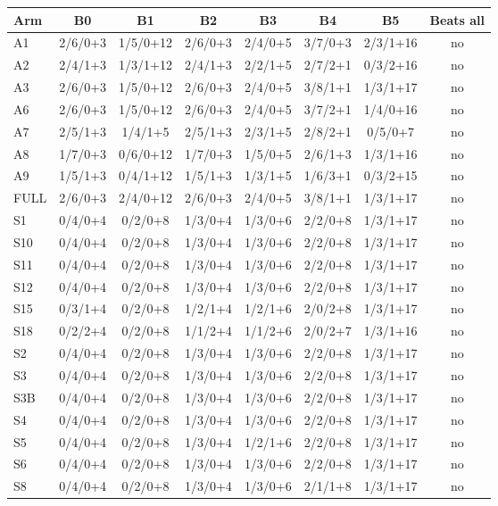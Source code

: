 \begin{table}[!t]
\centering\small
\begin{adjustbox}{max width=\textwidth}
\begin{tabular}{@{}lccccccc@{}}
\toprule
Arm & B0 & B1 & B2 & B3 & B4 & B5 & Beats all \\
\midrule
A1 & 2/6/0+3 & 1/5/0+12 & 2/6/0+3 & 2/4/0+5 & 3/7/0+3 & 2/3/1+16 & no \\
A2 & 2/4/1+3 & 1/3/1+12 & 2/4/1+3 & 2/2/1+5 & 2/7/2+1 & 0/3/2+16 & no \\
A3 & 2/6/0+3 & 1/5/0+12 & 2/6/0+3 & 2/4/0+5 & 3/8/1+1 & 1/3/1+17 & no \\
A6 & 2/6/0+3 & 1/5/0+12 & 2/6/0+3 & 2/4/0+5 & 3/7/2+1 & 1/4/0+16 & no \\
A7 & 2/5/1+3 & 1/4/1+5 & 2/5/1+3 & 2/3/1+5 & 2/8/2+1 & 0/5/0+7 & no \\
A8 & 1/7/0+3 & 0/6/0+12 & 1/7/0+3 & 1/5/0+5 & 2/6/1+3 & 1/3/1+16 & no \\
A9 & 1/5/1+3 & 0/4/1+12 & 1/5/1+3 & 1/3/1+5 & 1/6/3+1 & 0/3/2+15 & no \\
FULL & 2/6/0+3 & 2/4/0+12 & 2/6/0+3 & 2/4/0+5 & 3/8/1+1 & 1/3/1+17 & no \\
S1 & 0/4/0+4 & 0/2/0+8 & 1/3/0+4 & 1/3/0+6 & 2/2/0+8 & 1/3/1+17 & no \\
S10 & 0/4/0+4 & 0/2/0+8 & 1/3/0+4 & 1/3/0+6 & 2/2/0+8 & 1/3/1+17 & no \\
S11 & 0/4/0+4 & 0/2/0+8 & 1/3/0+4 & 1/3/0+6 & 2/2/0+8 & 1/3/1+17 & no \\
S12 & 0/4/0+4 & 0/2/0+8 & 1/3/0+4 & 1/3/0+6 & 2/2/0+8 & 1/3/1+17 & no \\
S15 & 0/3/1+4 & 0/2/0+8 & 1/2/1+4 & 1/2/1+6 & 2/0/2+8 & 1/3/1+17 & no \\
S18 & 0/2/2+4 & 0/2/0+8 & 1/1/2+4 & 1/1/2+6 & 2/0/2+7 & 1/3/1+16 & no \\
S2 & 0/4/0+4 & 0/2/0+8 & 1/3/0+4 & 1/3/0+6 & 2/2/0+8 & 1/3/1+17 & no \\
S3 & 0/4/0+4 & 0/2/0+8 & 1/3/0+4 & 1/3/0+6 & 2/2/0+8 & 1/3/1+17 & no \\
S3B & 0/4/0+4 & 0/2/0+8 & 1/3/0+4 & 1/3/0+6 & 2/2/0+8 & 1/3/1+17 & no \\
S4 & 0/4/0+4 & 0/2/0+8 & 1/3/0+4 & 1/3/0+6 & 2/2/0+8 & 1/3/1+17 & no \\
S5 & 0/4/0+4 & 0/2/0+8 & 1/3/0+4 & 1/2/1+6 & 2/2/0+8 & 1/3/1+17 & no \\
S6 & 0/4/0+4 & 0/2/0+8 & 1/3/0+4 & 1/3/0+6 & 2/2/0+8 & 1/3/1+17 & no \\
S8 & 0/4/0+4 & 0/2/0+8 & 1/3/0+4 & 1/3/0+6 & 2/1/1+8 & 1/3/1+17 & no \\

\end{tabular}
\end{adjustbox}
\end{table}

